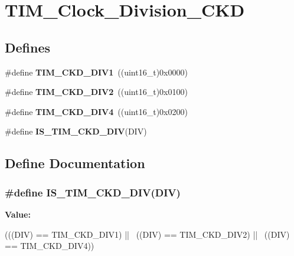 \hypertarget{group__TIM__Clock__Division__CKD}{
\section{TIM\_\-Clock\_\-Division\_\-CKD}
\label{group__TIM__Clock__Division__CKD}
}
\subsection*{Defines}
\begin{DoxyCompactItemize}
\item 
\hypertarget{group__TIM__Clock__Division__CKD_ga88691a07b3976791977d280045b3c850}{
\#define {\bfseries TIM\_\-CKD\_\-DIV1}~((uint16\_\-t)0x0000)}
\label{group__TIM__Clock__Division__CKD_ga88691a07b3976791977d280045b3c850}

\item 
\hypertarget{group__TIM__Clock__Division__CKD_ga46a5fd6a173a7e88528a6e4084a08665}{
\#define {\bfseries TIM\_\-CKD\_\-DIV2}~((uint16\_\-t)0x0100)}
\label{group__TIM__Clock__Division__CKD_ga46a5fd6a173a7e88528a6e4084a08665}

\item 
\hypertarget{group__TIM__Clock__Division__CKD_gac2e5c030f964f9b4c92fa8129fb923bc}{
\#define {\bfseries TIM\_\-CKD\_\-DIV4}~((uint16\_\-t)0x0200)}
\label{group__TIM__Clock__Division__CKD_gac2e5c030f964f9b4c92fa8129fb923bc}

\item 
\#define {\bfseries IS\_\-TIM\_\-CKD\_\-DIV}(DIV)
\end{DoxyCompactItemize}


\subsection{Define Documentation}
\hypertarget{group__TIM__Clock__Division__CKD_ga9298ec9ad2d578a4c54e6c0dd4c03946}{
\subsubsection[{IS\_\-TIM\_\-CKD\_\-DIV}]{\setlength{\rightskip}{0pt plus 5cm}\#define IS\_\-TIM\_\-CKD\_\-DIV(DIV)}}
\label{group__TIM__Clock__Division__CKD_ga9298ec9ad2d578a4c54e6c0dd4c03946}
{\bfseries Value:}
\begin{DoxyCode}
(((DIV) == TIM_CKD_DIV1) || \
                             ((DIV) == TIM_CKD_DIV2) || \
                             ((DIV) == TIM_CKD_DIV4))
\end{DoxyCode}
